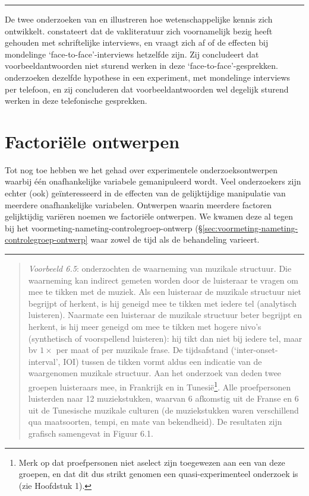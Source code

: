 \documentclass[
]{book}
\begin{document}
\begin{center}\rule{0.5\linewidth}{0.5pt}\end{center}

De twee onderzoeken van \citep{Houtk91} en \citep{Wijff92} illustreren hoe wetenschappelijke kennis zich
ontwikkelt. \citep{Houtk91} constateert dat de vakliteratuur zich voornamelijk bezig
heeft gehouden met schriftelijke interviews, en vraagt zich af of de
effecten bij mondelinge `face-to-face'-interviews hetzelfde zijn. Zij
concludeert dat voorbeeldantwoorden niet sturend werken in deze
`face-to-face'-gesprekken. \citep{Wijff92} onderzoeken dezelfde hypothese in een
experiment, met mondelinge interviews per telefoon, en zij concluderen
dat voorbeeldantwoorden wel degelijk sturend werken in deze telefonische
gesprekken.

\section{Factoriële ontwerpen}\label{sec:ontwerp-factorieel}

Tot nog toe hebben we het gehad over experimentele onderzoeksontwerpen
waarbij één onafhankelijke variabele gemanipuleerd wordt. Veel
onderzoekers zijn echter (ook) geïnteresseerd in de effecten van de
gelijktijdige manipulatie van meerdere onafhankelijke variabelen.
Ontwerpen waarin meerdere factoren gelijktijdig variëren noemen we
factoriële ontwerpen. We kwamen deze al tegen bij het
voormeting-nameting-controlegroep-ontwerp
(§\ref{sec:voormeting-nameting-controlegroep-ontwerp}
waar zowel de tijd als de behandeling varieert.

\begin{center}\rule{0.5\linewidth}{0.5pt}\end{center}

\begin{quote}
\emph{Voorbeeld 6.5}: \citet{Drake03}
onderzochten de waarneming van muzikale structuur. Die waarneming kan
indirect gemeten worden door de luisteraar te vragen om mee te tikken
met de muziek. Als een luisteraar de muzikale structuur niet begrijpt of
herkent, is hij geneigd mee te tikken met iedere tel (analytisch
luisteren). Naarmate een luisteraar de muzikale structuur beter begrijpt
en herkent, is hij meer geneigd om mee te tikken met hogere nivo's
(synthetisch of voorspellend luisteren): hij tikt dan niet bij iedere
tel, maar bv \(1\times\) per maat of per muzikale frase. De tijdsafstand
(`inter-onset-interval', IOI) tussen de tikken vormt aldus een indicatie
van de waargenomen muzikale structuur. Aan het onderzoek van deden twee
groepen luisteraars mee, in Frankrijk en in Tunesië\footnote{Merk op dat proefpersonen niet aselect zijn toegewezen aan een van deze groepen, en dat dit dus strikt genomen een quasi-experimenteel onderzoek is (zie Hoofdstuk 1).}. Alle
proefpersonen luisterden naar 12 muziekstukken, waarvan 6 afkomstig uit
de Franse en 6 uit de Tunesische muzikale culturen (de muziekstukken
waren verschillend qua maatsoorten, tempi, en mate van bekendheid). De
resultaten zijn grafisch samengevat in Figuur 6.1.
\end{quote}
\end{document}
